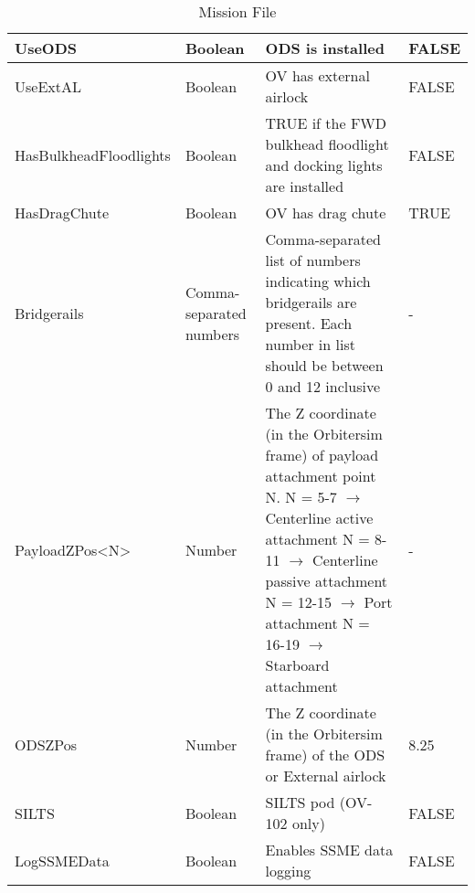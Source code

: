 \documentclass[Space_Shuttle_Ultra_Manual.tex]{subfiles}
\begin{document}
\begin{table}[H]
\begin{tabular}{|l|p{1.5cm}|p{7.5cm}|l|}
	\hline
	\rule{0pt}{2ex}
	UseODS & Boolean & ODS is installed & FALSE\\
	\hline
	\rule{0pt}{2ex}
	UseExtAL & Boolean & OV has external airlock & FALSE\\
	\hline
	\rule{0pt}{2ex}
	HasBulkheadFloodlights & Boolean & TRUE if the FWD bulkhead floodlight and docking lights are installed & FALSE\\
	\hline
	\rule{0pt}{2ex}
	HasDragChute & Boolean & OV has drag chute & TRUE\\
	\hline
	\rule{0pt}{2ex}
	Bridgerails & Comma-separated numbers & Comma-separated list of numbers indicating which bridgerails are present. Each number in list should be between 0 and 12 inclusive & -\\
	\hline
	\rule{0pt}{2ex}
	PayloadZPos<N> & Number & The Z coordinate (in the Orbitersim frame) of payload attachment point N.\newline
N = 5-7 $\rightarrow$ Centerline active attachment\newline
N = 8-11 $\rightarrow$ Centerline passive attachment\newline
N = 12-15 $\rightarrow$ Port attachment\newline
N = 16-19 $\rightarrow$ Starboard attachment & - \\
	\hline
	\rule{0pt}{2ex}
	ODSZPos & Number & The Z coordinate (in the Orbitersim frame) of the ODS or External airlock & 8.25\\
	\hline
	\rule{0pt}{2ex}
	SILTS & Boolean & SILTS pod (OV-102 only) & FALSE\\
	\hline\rule{0pt}{2ex}
	LogSSMEData & Boolean & Enables SSME data logging & FALSE\\
	\hline
  \end{tabular}
  \caption{Mission File}
  \label{tab:Mission_File}
\end{table}
\end{document}
